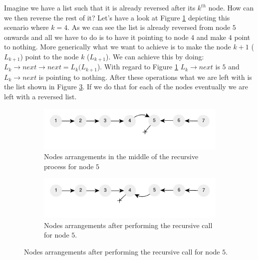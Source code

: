 Imagine we have a list such that it is already reversed after its $k^{th}$ node. How can we then reverse the rest of it?
Let's have a look at Figure \ref{fig:list_reverse:list_reverse_recursive_intermediate} depicting
this scenario where $k=4$. As we can see the list is already reversed from node $5$ onwards and all
we have to do is to have it pointing to node $4$ and make $4$ point to nothing. More generically
what we want to achieve is to make the node $k+1$ ($L_{k+1}$) point to the node $k$ ($L_{k+1}$). We
can achieve this by doing: $L_{k} \rightarrow next \rightarrow next= L_{k}(L_{k+1}$). With regard to  Figure
\ref{fig:list_reverse:list_reverse_recursive_intermediate} $L_{k} \rightarrow next$ is $5$ and
$L_{k} \rightarrow next$ is pointing to nothing. After these operations what we are left with is the
list  shown in Figure \ref{fig:list_reverse:list_reverse_recursive_intermediate1}. If we do that for
each of the nodes eventually we are left with a reversed list. 

\begin{figure}
	\vspace*{-0.5in}
	\centering
	\begin{subfigure}[t]{0.49\textwidth}
		\centering
		\includegraphics[width=\textwidth]{sources/list_reverse/images/list_reverse_recursive_intermediate}
		\caption[]{Nodes arrangements in the middle of the recursive process for node $5$}
		\label{fig:list_reverse:list_reverse_recursive_intermediate}
	 \end{subfigure}
	\hfill
	\begin{subfigure}[t]{0.49\textwidth}
		\centering
	\includegraphics[width=\textwidth]{sources/list_reverse/images/list_reverse_recursive_intermediate1}
	\caption[]{Nodes arrangements after performing the recursive call for node $5$.}
	\label{fig:list_reverse:list_reverse_recursive_intermediate1}
	 \end{subfigure}
\end{figure}

